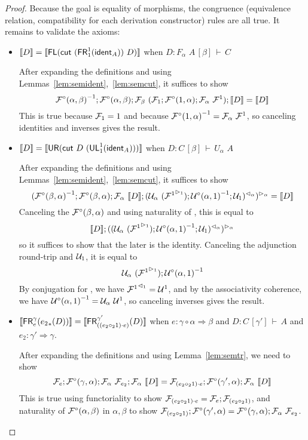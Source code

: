 \documentclass{drl-common/llncs}
\renewcommand{\sem}[1]{\ensuremath{ \llbracket #1 \rrbracket}}
\newcommand{\inv}[1]{\ensuremath{{#1}^{-1}}}
\newcommand{\tc}[2]{\ensuremath{#1 \Rightarrow #2}}
\newcommand\compo[2]{\ensuremath{#1 \circ #2}}
\newcommand\compv[2]{\ensuremath{#1 \cdot #2}}
\newcommand\comph[2]{\ensuremath{#1 \mathbin{\circ_2} #2}}
\newcommand\F[2]{\ensuremath{F_{#1} \,\, #2}}
\newcommand\U[2]{\ensuremath{U_{#1} \,\, #2}}
\newcommand\seq[3]{\ensuremath{#1 \, [ #2 ] \, \vdash \, #3}}
\newcommand\tr[2]{\ensuremath{{{#1}_{*}(#2)}}}
\newcommand\ident[1]{\ensuremath{\dsd{ident}_{#1}}}
\newcommand\cutsym{\ensuremath{\dsd{cut}}}
\newcommand\cut[2]{\ensuremath{{\cutsym \,\, #1 \,\, #2}}}
\newcommand\UL[3]{\ensuremath{\dsd{UL}^{#1}_{#2}(#3)}}
\newcommand\FR[3]{\ensuremath{\dsd{FR}^{#1}_{#2}(#3)}}
\newcommand\FL[1]{\ensuremath{\dsd{FL}(#1)}}
\newcommand\UR[1]{\ensuremath{\dsd{UR}(#1)}}
\begin{document}
\begin{proof}
Because the goal is equality of morphisms, the congruence (equivalence
relation, compatibility for each derivation constructor) rules are all
true.  It remains to validate the axioms:

\begin{itemize}
\item $\sem{D} = \sem{\FL {\cut{(\FR 1 1 {\ident{A}})}{D}} }$
when ${D : \seq{\F \alpha A}{\beta}{C}}$

After expanding the definitions and using
Lemmas~\ref{lem:semident},~\ref{lem:semcut}, it suffices to show
\[
\inv{\semFcomp(\alpha,\beta)};\semFcomp(\alpha,\beta);\semF{\beta}{(\semFo{1};\semFcomp(1,\alpha);\semF{\alpha}{\semFone})};\sem{D}
= \sem{D}
\]
This is true because ${\mathcal{F}_{1}} = 1$ and because
$\inv{\semFcomp(1,\alpha)} = \semF{\alpha}{\semFone}$, so canceling
identities and inverses gives the result.  

\item $\sem{D} = \sem{\UR {\cut{D}{(\UL 1 1 {\ident{A}})}}}$
when ${D : \seq{C}{\beta}{\U \alpha A}}$

After expanding the definitions and using
Lemmas~\ref{lem:semident},~\ref{lem:semcut}, it suffices to show
\[
\semltor{(\inv{\semFcomp(\beta,\alpha)};\semFcomp(\beta,\alpha);\semF{\alpha}{\sem D};\semrtol{(\semU{\alpha}{(\semltor{\semFone}{1})};\inv{\semUcomp(\alpha,1)};\semUo{1})}{\alpha})}{\alpha}
= \sem{D}
\]
Canceling the $\mathcal{F}^\circ(\beta,\alpha)$ and using naturality of
\semltor{-}{\alpha}, this is equal to
\[
\sem{D};\semltor{(\semrtol{(\semU{\alpha}{(\semltor{\semFone}{1})};\inv{\semUcomp(\alpha,1)};\semUo{1})}{\alpha})}{\alpha}
\]
so it suffices to show that the later is the identity.  Canceling the
adjunction round-trip and $\mathcal{U}_{1}$, it is equal to
\[
\semU{\alpha}{(\semltor{\semFone}{1})};\inv{\semUcomp(\alpha,1)}
\]
By conjugation for \semFone, we have ${\mathcal{F}^1}^{\vartriangleleft_{1}} = {\mathcal{U}^1}$, and by
the associativity coherence, we have $\inv{\semUcomp(\alpha,1)} =
\semU{\alpha}{\semUone}$, so canceling inverses gives the result.  

\item $\sem{{\FR{\gamma}{e}{\tr{e_2}{D}}}} = \sem{\FR{\gamma'}{(\compv{(\comph{e_2}{1})}{e})}{D}}$
when $e : \tc{\compo{\gamma}{\alpha}}{\beta}$
and $D : \seq{C}{\gamma'}{A}$
and $e_2 : \tc{\gamma'}{\gamma}$.

After expanding the definitions and using Lemma~\ref{lem:semtr}, we need
to show
\[
\semFo{e};\semFcomp(\gamma,\alpha);\semF{\alpha}{\semFo{e_2}};\semF{\alpha}{\sem{D}}
= \semFo{\compv{(\comph{e_2}{1})}{e}};\semFcomp(\gamma',\alpha);\semF{\alpha}{\sem{D}}
\]
This is true using functoriality to show $\semFo{\compv{(\comph{e_2}{1})}{e}} =
\semFo{e};\semFo{{(\comph{e_2}{1})}}$,
and naturality of $\mathcal{F}^\circ(\alpha,\beta)$ in $\alpha,\beta$ to show
$\semFo{{(\comph{e_2}{1})}};\semFcomp(\gamma',\alpha) =
\semFcomp(\gamma,\alpha);\semF{\alpha}{\semFo{e_2}}$.  
  


\end{itemize}
\end{proof}
\end{document}
